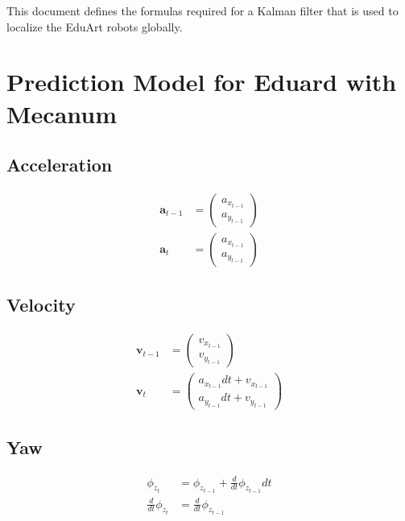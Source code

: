 \documentclass{article}
\begin{document}
This document defines the formulas required for a Kalman filter that is used to localize the EduArt robots globally.

\section{Prediction Model for Eduard with Mecanum}

\subsection{Acceleration}
\begin{align}
  \textbf{a}_{t-1} &= \left(\begin{matrix}a_{x_{t-1}}\\a_{y_{t-1}}\end{matrix}\right) \\
  \textbf{a}_t &= \left(\begin{matrix}a_{x_{t-1}}\\a_{y_{t-1}}\end{matrix}\right)
\end{align}

\subsection{Velocity}
\begin{align}
  \textbf{v}_{t-1} &= \left(\begin{matrix}v_{x_{t-1}}\\v_{y_{t-1}}\end{matrix}\right) \\
  \textbf{v}_t &= \left(\begin{matrix}a_{x_{t-1}} dt + v_{x_{t-1}}\\a_{y_{t-1}} dt + v_{y_{t-1}}\end{matrix}\right)
\end{align}

\subsection{Yaw}
\begin{align}
  \phi_{z_t} &= \phi_{z_{t-1}} + \frac{d}{dt}\phi_{z_{t-1}} dt \\
  \frac{d}{dt}\phi_{z_t} &= \frac{d}{dt}\phi_{z_{t-1}}
\end{align}
\end{document}

